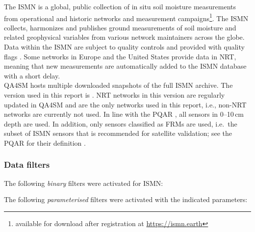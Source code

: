 \noindent The \ac{ISMN} \citep{dorigo2021} is a global, public collection of in situ soil moisture measurements from operational and historic networks and measurement campaigns\footnote{available for download after registration at \url{https://ismn.earth}}.
The \ac{ISMN} collects, harmonizes and publishes ground measurements of soil moisture and related geophysical variables from various network maintainers across the globe.
Data within the \ac{ISMN} are subject to quality controls and provided with quality flags \citep{dorigo2013}.
Some networks in Europe and the United States provide data in \ac{NRT}, meaning that new measurements are automatically added to the \ac{ISMN} database with a short delay.
\\[1em]
\ac{QA4SM} hosts multiple downloaded snapshots of the full \ac{ISMN} archive.
The version used in this report is .
\ac{NRT} networks in this version are regularly updated in \ac{QA4SM} and are the only networks used in this report, i.e., non-NRT networks are currently not used.
In line with the \ac{PQAR} \citep{c3spqar}, all sensors in 0--10\,cm depth are used.
In addition, only sensors classified as \ac{FRMs} are used, i.e.\ the subset of \ac{ISMN} sensors that is recommended for satellite validation; see the \ac{PQAR} for their definition \citep{c3spqar}.

\subsubsection{Data filters}

\noindent The following \textit{binary} filters were activated for \ac{ISMN}:
\begin{itemize}
\end{itemize}
\vspace{1em}
\noindent The following \textit{parameterised} filters were activated with the indicated parameters:
\begin{itemize}
\end{itemize}
\vspace{1em}

